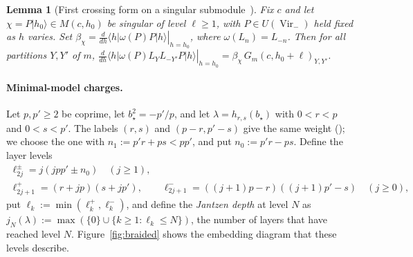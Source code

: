 \documentclass[twoside,10pt]{article}
\numberwithin{equation}{section}
\theoremstyle{slbody}
\newtheorem{lemma}[theorem]{Lemma}
\theoremstyle{definition}
\theoremstyle{remark}
\newcommand{\Vir}{\operatorname{Vir}}
\begin{document}
\begin{lemma}[First crossing form on a singular submodule~{\cite[Lemma~5.6]{PolzerColliding2026}}]
\label{lem:singular-crossing}
Fix \(c\) and let \(\chi=P|h_0\rangle\in M(c,h_0)\) be singular of level
\(\ell\geq1\), with \(P\in U(\Vir_-)\) held fixed as \(h\) varies.  Set
\(\beta_\chi=\left.\frac{d}{dh}\langle h|\omega(P)P|h\rangle\right|_{h=h_0}\),
where \(\omega(L_n)=L_{-n}\).  Then for all partitions \(Y,Y'\) of \(m\),
\(\left.\frac{d}{dh}\langle h|\omega(P)L_YL_{-Y'}P|h\rangle\right|_{h=h_0}
=\beta_\chi\,G_m(c,h_0+\ell)_{Y,Y'}\).
\end{lemma}

\paragraph{Minimal-model charges.}  Let \(p,p'\geq2\) be
coprime, let \(b_\star^2=-p'/p\), and let \(\lambda=h_{r,s}(b_\star)\) with
\(0<r<p\) and \(0<s<p'\).  The labels \((r,s)\) and \((p-r,p'-s)\) give the
same weight (\cite[Proposition~3.2]{PolzerColliding2026}); we choose the one with
\(n_1:=p'r+ps<pp'\), and put \(n_0:=p'r-ps\).  Define the layer levels
\begin{gather*}
 \ell^\pm_{2j}=j(jpp'\pm n_0)\quad(j\geq1),\\
 \ell^+_{2j+1}=(r+jp)(s+jp'),\qquad
 \ell^-_{2j+1}=((j+1)p-r)((j+1)p'-s)\quad(j\geq0),
\end{gather*}
put \(\ell_k:=\min(\ell^+_k,\ell^-_k)\), and define the \emph{Jantzen depth}
at level \(N\) as
\(j_N(\lambda):=\max(\{0\}\cup\{k\geq1:\ell_k\leq N\})\), the number of layers
that have reached level \(N\).  Figure~\ref{fig:braided} shows the embedding
diagram that these levels describe.
\end{document}
